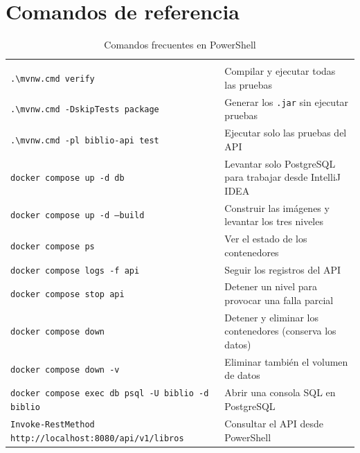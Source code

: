 \chapter{Comandos de referencia}\label{ap:comandos}

\begin{xltabular}{\linewidth}{@{}L{7.4cm}Y@{}}
	\caption{Comandos frecuentes en PowerShell}\label{tab:comandos}\\
	\toprule
	 &  \\
	\midrule
	\endfirsthead
	\toprule
	 &  \\
	\midrule
	\endhead
	\texttt{.\textbackslash mvnw.cmd verify} & Compilar y ejecutar todas las pruebas \\
	\texttt{.\textbackslash mvnw.cmd -DskipTests package} & Generar los \texttt{.jar} sin ejecutar pruebas \\
	\texttt{.\textbackslash mvnw.cmd -pl biblio-api test} & Ejecutar solo las pruebas del API \\
	\texttt{docker compose up -d db} & Levantar solo PostgreSQL para trabajar desde IntelliJ IDEA \\
	\texttt{docker compose up -d --build} & Construir las imágenes y levantar los tres niveles \\
	\texttt{docker compose ps} & Ver el estado de los contenedores \\
	\texttt{docker compose logs -f api} & Seguir los registros del API \\
	\texttt{docker compose stop api} & Detener un nivel para provocar una falla parcial \\
	\texttt{docker compose down} & Detener y eliminar los contenedores (conserva los datos) \\
	\texttt{docker compose down -v} & Eliminar también el volumen de datos \\
	\texttt{docker compose exec db psql -U biblio -d biblio} & Abrir una consola SQL en PostgreSQL \\
	\texttt{Invoke-RestMethod http://localhost:8080/api/v1/libros} & Consultar el API desde PowerShell \\
	\bottomrule
\end{xltabular}
